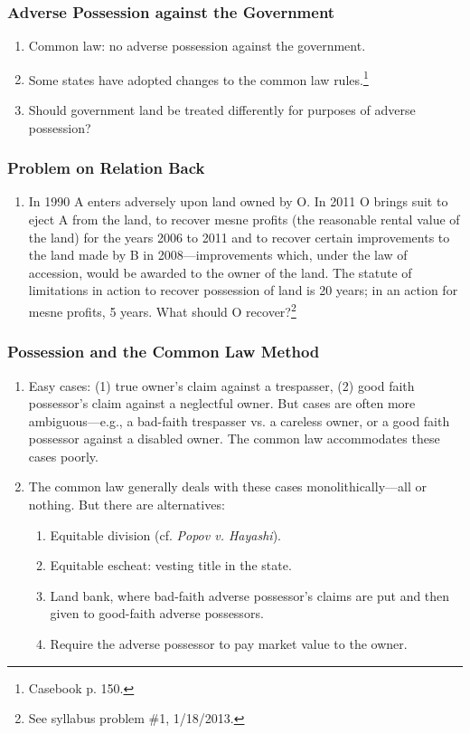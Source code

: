 \subsubsection{Adverse Possession against the Government}

\begin{enumerate}
    \item Common law: no adverse possession against the government.
    \item Some states have adopted changes to the common law 
    rules.\footnote{Casebook p. 150.}
    \item Should government land be treated differently for purposes of 
    adverse possession?
\end{enumerate}

\subsubsection{Problem on Relation Back}

\begin{enumerate}
    \item In 1990 A enters adversely upon land owned by O. In 2011 O brings 
    suit to eject A from the land, to recover mesne profits (the reasonable 
    rental value of the land) for the years 2006 to 2011 and to recover 
    certain improvements to the land made by B in 2008---improvements which, 
    under the law of accession, would be awarded to the owner of the land. 
    The statute of limitations in action to recover possession of land is 20 
    years; in an action for mesne profits, 5 years. What should O 
    recover?\footnote{See syllabus problem \#1, 1/18/2013.}
\end{enumerate}

\subsubsection{Possession and the Common Law Method}

\begin{enumerate}
    \item Easy cases: (1) true owner's claim against a trespasser, (2) good 
    faith possessor's claim against a neglectful owner. But cases are often 
    more ambiguous---e.g., a bad-faith trespasser vs. a careless owner, or a 
    good faith possessor against a disabled owner. The common law accommodates 
    these cases poorly.
    \item The common law generally deals with these cases monolithically---all 
    or nothing. But there are alternatives:
    \begin{enumerate}
        \item Equitable division (cf. \emph{Popov v. Hayashi}).
        \item Equitable escheat: vesting title in the state.
        \item Land bank, where bad-faith adverse possessor's claims are put 
        and then given to good-faith adverse possessors.
        \item Require the adverse possessor to pay market value to the owner.
    \end{enumerate}
\end{enumerate}

